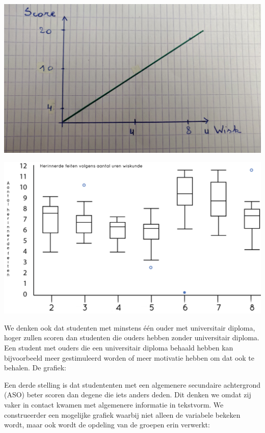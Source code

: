 \documentclass{hogent-article}
\begin{document}
	
	\begin{minipage}[b]{2.8in}
		\centering
		\includegraphics[width=\linewidth]{img/imgg1.jpg}
	\end{minipage}
	
	\begin{minipage}[b]{2.8in}
		\centering
		\includegraphics[width=\linewidth]{img/mockboxplot.png}
	\end{minipage}
	
	
	We denken ook dat studenten met minstens één ouder met universitair diploma, hoger zullen scoren dan studenten die ouders hebben zonder universitair diploma. 
	Een student met ouders die een universitair diploma behaald hebben kan bijvoorbeeld meer gestimuleerd worden of meer motivatie hebben om dat ook te behalen. 
	De grafiek:
	
	Een derde stelling is dat studententen met een algemenere secundaire achtergrond (ASO) beter scoren dan degene die iets anders deden. Dit denken we omdat zij vaker in contact kwamen met algemenere informatie in tekstvorm. We construeerder een mogelijke grafiek waarbij niet alleen de variabele bekeken wordt, maar ook wordt de opdeling van de groepen erin verwerkt:
	
\end{document}

